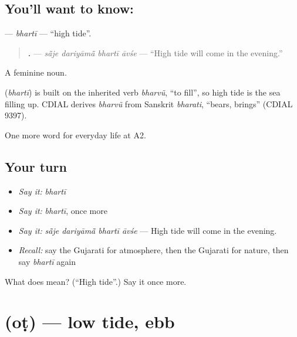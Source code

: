 \subsection*{You'll want to know: }
\textbf{} — \emph{bhartī} — \textquotedblleft{}high tide\textquotedblright{}.

\begin{quote}
\textbf{   .} — \emph{sā̃je dariyāmā̃ bhartī āvśe} — \textquotedblleft{}High tide will come in the evening.\textquotedblright{}
\end{quote}

A feminine noun.

\begin{cousinweb}
\textbf{} (\emph{bhartī}) is built on the inherited verb \emph{bharvũ}, \textquotedblleft{}to fill\textquotedblright{}, so high tide is the sea filling up. CDIAL derives \emph{bharvũ} from Sanskrit \emph{bharati}, \textquotedblleft{}bears, brings\textquotedblright{} (CDIAL 9397).
\end{cousinweb}

\begin{grammarlens}[title={What you've built}]
One more word for everyday life at A2.
\end{grammarlens}

\subsection*{Your turn}
\begin{itemize}
\raggedright
  \item \emph{Say it:} \emph{bhartī}
  \item \emph{Say it:} \emph{bhartī}, once more
  \item \emph{Say it:} \emph{sā̃je dariyāmā̃ bhartī āvśe} — High tide will come in the evening.
  \item \emph{Recall:} say the Gujarati for atmosphere, then the Gujarati for nature, then say \emph{bhartī} again
\end{itemize}

\begin{tcolorbox}[breakable,colback=teal!4,colframe=teal!35!black,title={Before you move on}]
What does  mean? (\textquotedblleft{}High tide\textquotedblright{}.) Say it once more.
\end{tcolorbox}
\section[\texorpdfstring{\gu{ઓટ} (oṭ)}{ઓટ (oṭ)}]{ (oṭ) — low tide, ebb}


